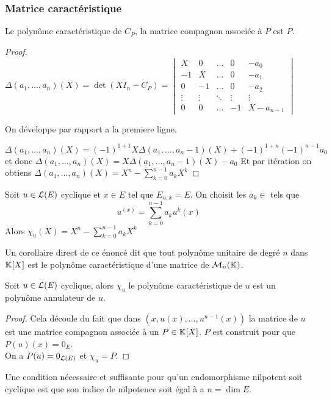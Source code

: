 \subsubsection{Matrice caractéristique }

\begin{prop}
	Le polynôme caractéristique de $C_P$, la matrice compagnon associée à $P$ est $P$.
\end{prop}

\begin{proof}
	$\Delta(a_1, \ldots, a_n)(X) = \det (XI_n - C_P) =
		\begin{vmatrix}
			X      & 0      & \ldots & 0      & -a_0      \\
			-1     & X      & \ldots & 0      & -a_1      \\
			0      & -1     & \ldots & 0      & -a_2      \\
			\vdots & \vdots & \ddots & \vdots & \vdots    \\
			0      & 0      & \ldots & -1     & X-a_{n-1}
		\end{vmatrix}$

	On développe par rapport a la premiere ligne.

	$$ \Delta(a_1, \ldots, a_n)(X) = (-1)^{1+1}X\Delta(a_1, \ldots, a_n-1)(X) + (-1)^{1+n}(-1)^{n-1}a_0$$
	et donc $\Delta(a_1, \ldots, a_n)(X) = X\Delta(a_1, \ldots, a_n-1)(X) - a_0 $
	Et par itération on obtiens $\Delta(a_1, \ldots, a_n)(X) = X^n - \sum_{k=0}^{n-1} a_k X^k$
\end{proof}



\begin{prop}
	Soit $u \in \mathcal{L}(E)$ cyclique et $x \in E$ tel que $E_{u,x} = E$. On choisit les $a_k \in $ tels que
	$$u ^(x) = \sum_{k=0}^{n-1} a_k u^k(x)$$
	Alors $\chi_u (X) = X^n - \sum_{k=0}^{n-1} a_k X^k$
\end{prop}

\begin{remarque}
	Un corollaire direct de ce énoncé dit que tout polynôme unitaire de degré $n$ dans $\mathbb{K}[X]$ est le polynôme caractéristique
	d'une matrice de $\mathcal{M}_n(\mathbb{K})$.
\end{remarque}

\begin{theorem}
	Soit $u \in \mathcal{L}(E)$ cyclique, alors $\chi_u $ le polynôme caractéristique de $u$ est un
	polynôme annulateur de $u$.
\end{theorem}

\begin{proof}
	Cela découle du fait que dans $(x, u(x), \ldots, u^{n-1}(x))$ la matrice de $u$ est une matrice compagnon associée à un $P \in \mathbb{K}[X]$.
	$P$ est construit pour que $P(u)(x) = 0_E$.\\
	On a $P(u) = 0_{\mathcal{L}(E)}$ et $\chi_u = P$.
\end{proof}


\begin{example}
	Une condition nécessaire et suffisante pour qu'un endomorphisme nilpotent soit cyclique est
	que son indice de nilpotence soit égal à a $n = \dim E$.
\end{example}
